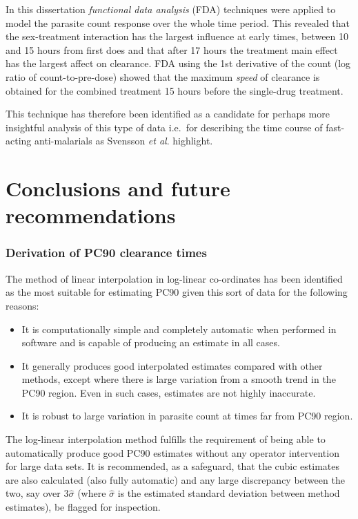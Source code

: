 In this dissertation \emph{functional data analysis} (FDA) techniques were applied to model the parasite count response over the whole time period. This revealed that the sex-treatment interaction has the largest influence at early times, between 10 and 15 hours from first does and that after 17 hours the treatment main effect has the largest affect on clearance. FDA using the 1st derivative of the count (log ratio of count-to-pre-dose) showed that the maximum \emph{speed} of clearance is obtained for the combined treatment 15 hours before the single-drug treatment.

This technique has therefore been identified as a candidate for perhaps more insightful analysis of this type of data i.e.\ for describing the time course of fast-acting anti-malarials as Svensson {\it et al}. highlight.

\section{Conclusions and future recommendations}

\subsubsection*{Derivation of PC90 clearance times}
The method of linear interpolation in log-linear co-ordinates has been identified as the most suitable for estimating PC90 given this sort of data for the following reasons:
\begin{itemize}
\item It is computationally simple and completely automatic when performed in software and is capable of producing an estimate in all cases.
\item It generally produces good interpolated estimates compared with other methods, except where there is large variation from a smooth trend in the PC90 region. Even in such cases, estimates are not highly inaccurate.
\item It is robust to large variation in parasite count at times far from PC90 region.
\end{itemize}
The log-linear interpolation method fulfills the requirement of being able to automatically produce good PC90 estimates without any operator intervention for large data sets. It is recommended, as a safeguard, that the cubic estimates are also calculated (also fully automatic) and any large discrepancy between the two, say over 3$\hat{\sigma}$ (where $\hat{\sigma}$ is the estimated standard deviation between method estimates), be flagged for inspection.
